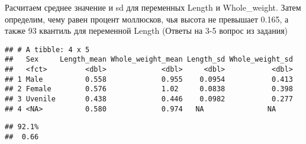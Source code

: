 \documentclass[]{article}
\newenvironment{Shaded}{\begin{snugshade}}{\end{snugshade}}
\newcommand{\CommentTok}[1]{\textcolor[rgb]{0.56,0.35,0.01}{\textit{#1}}}
\newcommand{\DecValTok}[1]{\textcolor[rgb]{0.00,0.00,0.81}{#1}}
\newcommand{\FloatTok}[1]{\textcolor[rgb]{0.00,0.00,0.81}{#1}}
\newcommand{\KeywordTok}[1]{\textcolor[rgb]{0.13,0.29,0.53}{\textbf{#1}}}
\newcommand{\NormalTok}[1]{#1}
\newcommand{\OperatorTok}[1]{\textcolor[rgb]{0.81,0.36,0.00}{\textbf{#1}}}
\newcommand{\StringTok}[1]{\textcolor[rgb]{0.31,0.60,0.02}{#1}}
\begin{document}
Расчитаем среднее значение и sd для переменных Length и Whole\_weight.
Затем определим, чему равен процент моллюсков, чья высота не превышает
0.165, а также 93 квантиль для переменной Length (Ответы на 3-5 вопрос
из задания)

\begin{Shaded}
\end{Shaded}

\begin{verbatim}
## # A tibble: 4 x 5
##   Sex     Length_mean Whole_weight_mean Length_sd Whole_weight_sd
##   <fct>         <dbl>             <dbl>     <dbl>           <dbl>
## 1 Male          0.558             0.955    0.0954           0.413
## 2 Female        0.576             1.02     0.0838           0.398
## 3 Uvenile       0.438             0.446    0.0982           0.277
## 4 <NA>          0.580             0.974   NA               NA
\end{verbatim}

\begin{Shaded}
\end{Shaded}

\begin{verbatim}
## 92.1% 
##  0.66
\end{verbatim}
\end{document}

